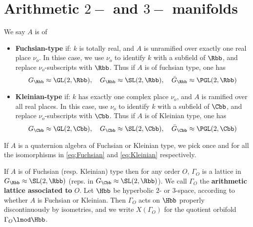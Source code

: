     \section{Arithmetic $2-$ and $3-$ manifolds}
    \begin{definition}
        We say $A$ is of
        \begin{itemize}
            \item    \textbf{Fuchsian-type} if: $k$ is totally real, and $A$ is unramified over exactly one real place $\nu_o$. In thise case, we use $\nu_o$ to identify $k$ with a subfield of $\Rbb$, and replace $\nu_o$-subscripts with $\Rbb$. Thus if $A$ is of fuchsian type, one has
                  \begin{align}\label{eq:Fuchsian}
                      G_\Rbb \approx \GL(2,\Rbb),\quad G_\Rbb \approx \SL(2,\Rbb),\quad  \bar{G}_\Rbb \approx \PGL(2,\Rbb)
                  \end{align}
            \item \textbf{Kleinian-type} if: $k$ has exactly one complex place $\nu_o$, and $A$ is ramified over all real places. In this case, use $\nu_o$ to identify $k$ with a subfield of $\Cbb$, and replace $\nu_o$-subscripts with $\Cbb$. Thus if $A$ is of Kleinian type, one has
                  \begin{align}\label{eq:Kleinian}
                      G_\Cbb \approx \GL(2,\Cbb),\quad G_\Cbb \approx\SL(2,\Cbb),\quad  \bar{G}_\Cbb \approx \PGL(2,\Cbb)
                  \end{align}
        \end{itemize}
    \end{definition}
    If $A$ is a quaternion algebra of Fuchsian or Kleinian type, we pick once and for all the isomorphisms in \ref{eq:Fuchsian} and \ref{eq:Kleinian}  respectively.









    If $A$ is of Fuchsian (resp. Kleinian) type then  for any order $O$,   $\Gamma_O$ is a lattice in $G_\Rbb  \approx \SL(2,\Rbb)$ (reps. in $G_\Cbb\approx \SL(2,\Rbb)$). We call $\Gamma_O$ the \textbf{arithmetic lattice associated to} $O$. Let $\Hbb$ be hyperbolic $2$- or $3$-space, according to whether $A$ is Fuchsian or Kleinian. Then $\Gamma_O$ acts on $\Hbb$ properly discontinuously by isometries, and we write $X(\Gamma_O)$ for the quotient orbifold $\Gamma_O \lmod \Hbb$.





